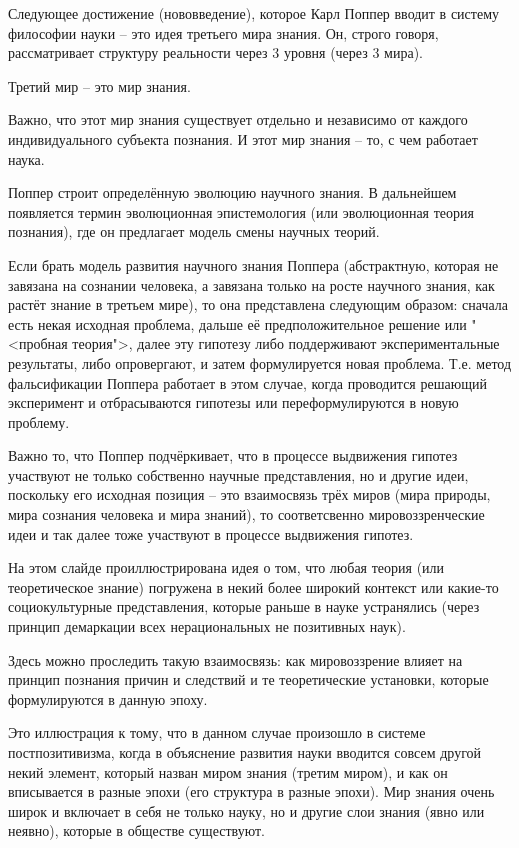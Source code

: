 \documentclass[main.tex]{subfiles}
\begin{document}
Следующее достижение (нововведение), которое Карл Поппер вводит в систему философии науки -- это идея третьего мира знания.
Он, строго говоря, рассматривает структуру реальности через 3 уровня (через 3 мира).

Третий мир -- это мир знания.

Важно, что этот мир знания существует отдельно и независимо от каждого индивидуального субъекта познания.
И этот мир знания -- то, с чем работает наука.


Поппер строит определённую эволюцию научного знания.
В дальнейшем появляется термин эволюционная эпистемология (или эволюционная теория познания), где он предлагает модель смены научных теорий.

Если брать модель развития научного знания Поппера (абстрактную, которая не завязана на сознании человека, а завязана только на росте научного знания, как растёт знание в третьем мире), то она представлена следующим образом: сначала есть некая исходная проблема, дальше её предположительное решение или "<пробная теория">, далее эту гипотезу либо поддерживают экспериментальные результаты, либо опровергают, и затем формулируется новая проблема.
Т.е. метод фальсификации Поппера работает в этом случае, когда проводится решающий эксперимент и отбрасываются гипотезы или переформулируются в новую проблему. 

Важно то, что Поппер подчёркивает, что в процессе выдвижения гипотез участвуют не только собственно научные представления, но и другие идеи, поскольку его исходная позиция -- это взаимосвязь трёх миров (мира природы, мира сознания человека и мира знаний), то соответсвенно мировоззренческие идеи и так далее тоже участвуют в процессе выдвижения гипотез.



На этом слайде проиллюстрирована идея о том, что любая теория (или теоретическое знание) погружена в некий более широкий контекст или какие-то социокультурные представления, которые раньше в науке устранялись (через принцип демаркации всех нерациональных не позитивных наук).

Здесь можно проследить такую взаимосвязь: как мировоззрение влияет на принцип познания причин и следствий и те теоретические установки, которые формулируются в данную эпоху.

Это иллюстрация к тому, что в данном случае произошло в системе постпозитивизма, когда в объяснение развития науки вводится совсем другой некий элемент, который назван миром знания (третим миром), и как он вписывается в разные эпохи (его структура в разные эпохи).
Мир знания очень широк и включает в себя не только науку, но и другие слои знания (явно или неявно), которые в обществе существуют.
\end{document}
